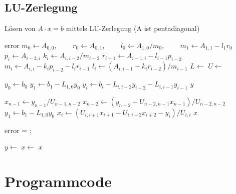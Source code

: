 \subsection{LU-Zerlegung}
\begin{Algorithmus}[H]
\caption{Lösen von $A\cdot x = b$ mittels LU-Zerlegung (A ist pentadiagonal)}
\label{alg:LU}
\begin{algorithmic}
	    \State \Return error
	\EndIf
    \State $m_0 \gets A_{0,0}$, $\qquad r_0 \gets A_{0,1}$, $\qquad l_0 \gets A_{1,0}/m_0$, $ \qquad m_1 \gets A_{1,1}- l_1r_0$
        \State $p_i \gets A_{i-2,i}$
        \State $k_i \gets A_{i,i-2}/m_{i-2}$
        \State $r_{i-1} \gets A_{i-1,i} - l_{i-1}  p_{i-2}$
        \State $m_i \gets A_{i,i} - k_i p_{i-2} - l_i  r_{i-1}$
        \State $l_i \gets (A_{i,i-1}-k_i r_{i-2})/m_{i-1}$
    \EndFor
    \State $L \gets $         
    \State $U \gets $    
    \State \Return [L, U]
\EndFunction

        \State $y_0 \gets b_0$
        \State $y_1 \gets b_1 - L_{1,0} y_0$
            \State $y_i \gets b_i - L_{i,i-2} y_{i-2} - L_{i,i-1} y_{i-1}$
        \EndFor
        \Return $y$
\EndFunction


        \State $x_{n-1} \gets y_{n-1}/U_{n-1,n-2}$
        \State $x_{n-2} \gets (y_{n-2} - U_{n-2,n-1} x_{n-1})/U_{n-2,n-2}$
        \State $y_1 \gets b_1 - L_{1,0} y_0$
            \State $x_i \gets (U_{i,i+1} x_{i+1}- U_{i,i+2} x_{i+2} - y_i) / U_{i,i}$
        \EndFor
        \Return $x$
\EndFunction




	    \State \Return error
	\EndIf
	\State [L,U] = ;

    \State $y \gets $ 
    \State $x \gets $ 
    \State \Return $x$
\EndFunction
\end{algorithmic}
\end{Algorithmus}



\section{Programmcode}
